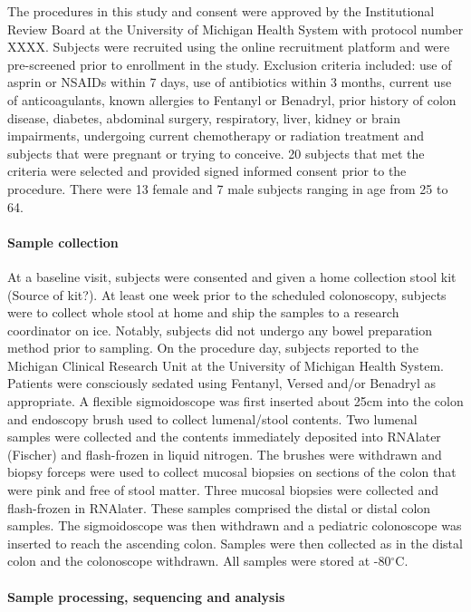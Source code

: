 \documentclass[11pt,]{article}
\let\oldparagraph\paragraph
\renewcommand{\paragraph}[1]{\oldparagraph{#1}\mbox{}}
\begin{document}
The procedures in this study and consent were approved by the
Institutional Review Board at the University of Michigan Health System
with protocol number XXXX. Subjects were recruited using the online
recruitment platform and were pre-screened prior to enrollment in the
study. Exclusion criteria included: use of asprin or NSAIDs within 7
days, use of antibiotics within 3 months, current use of anticoagulants,
known allergies to Fentanyl or Benadryl, prior history of colon disease,
diabetes, abdominal surgery, respiratory, liver, kidney or brain
impairments, undergoing current chemotherapy or radiation treatment and
subjects that were pregnant or trying to conceive. 20 subjects that met
the criteria were selected and provided signed informed consent prior to
the procedure. There were 13 female and 7 male subjects ranging in age
from 25 to 64.

\paragraph{Sample collection}\label{sample-collection}

At a baseline visit, subjects were consented and given a home collection
stool kit (Source of kit?). At least one week prior to the scheduled
colonoscopy, subjects were to collect whole stool at home and ship the
samples to a research coordinator on ice. Notably, subjects did not
undergo any bowel preparation method prior to sampling. On the procedure
day, subjects reported to the Michigan Clinical Research Unit at the
University of Michigan Health System. Patients were consciously sedated
using Fentanyl, Versed and/or Benadryl as appropriate. A flexible
sigmoidoscope was first inserted about 25cm into the colon and endoscopy
brush used to collect lumenal/stool contents. Two lumenal samples were
collected and the contents immediately deposited into RNAlater (Fischer)
and flash-frozen in liquid nitrogen. The brushes were withdrawn and
biopsy forceps were used to collect mucosal biopsies on sections of the
colon that were pink and free of stool matter. Three mucosal biopsies
were collected and flash-frozen in RNAlater. These samples comprised the
distal or distal colon samples. The sigmoidoscope was then withdrawn and
a pediatric colonoscope was inserted to reach the ascending colon.
Samples were then collected as in the distal colon and the colonoscope
withdrawn. All samples were stored at -80\(^\circ\)C.

\paragraph{Sample processing, sequencing and
analysis}\label{sample-processing-sequencing-and-analysis}
\end{document}
